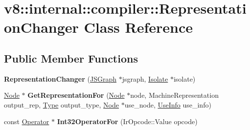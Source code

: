 \hypertarget{classv8_1_1internal_1_1compiler_1_1RepresentationChanger}{}\section{v8\+:\+:internal\+:\+:compiler\+:\+:Representation\+Changer Class Reference}
\label{classv8_1_1internal_1_1compiler_1_1RepresentationChanger}
\subsection*{Public Member Functions}
\begin{DoxyCompactItemize}
\item 
\mbox{\label{classv8_1_1internal_1_1compiler_1_1RepresentationChanger_ab47d442dae0649a232840eaa9b8ede97}} 
{\bfseries Representation\+Changer} (\mbox{\hyperlink{classv8_1_1internal_1_1compiler_1_1JSGraph}{J\+S\+Graph}} $\ast$jsgraph, \mbox{\hyperlink{classv8_1_1internal_1_1Isolate}{Isolate}} $\ast$isolate)
\item 
\mbox{\label{classv8_1_1internal_1_1compiler_1_1RepresentationChanger_ab0e2ad9e4430f46cba853cf357e41888}} 
\mbox{\hyperlink{classv8_1_1internal_1_1compiler_1_1Node}{Node}} $\ast$ {\bfseries Get\+Representation\+For} (\mbox{\hyperlink{classv8_1_1internal_1_1compiler_1_1Node}{Node}} $\ast$node, Machine\+Representation output\+\_\+rep, \mbox{\hyperlink{classv8_1_1internal_1_1compiler_1_1Type}{Type}} output\+\_\+type, \mbox{\hyperlink{classv8_1_1internal_1_1compiler_1_1Node}{Node}} $\ast$use\+\_\+node, \mbox{\hyperlink{classv8_1_1internal_1_1compiler_1_1UseInfo}{Use\+Info}} use\+\_\+info)
\item 
\mbox{\label{classv8_1_1internal_1_1compiler_1_1RepresentationChanger_a3557bda5a7d328d82d0bc8d947bf8012}} 
const \mbox{\hyperlink{classv8_1_1internal_1_1compiler_1_1Operator}{Operator}} $\ast$ {\bfseries Int32\+Operator\+For} (Ir\+Opcode\+::\+Value opcode)
\item 
\mbox{\label{classv8_1_1internal_1_1compiler_1_1RepresentationChanger_a3a487e97ba3463c4e189d4c7bb8b17b2}} 

\end{DoxyCompactItemize}
